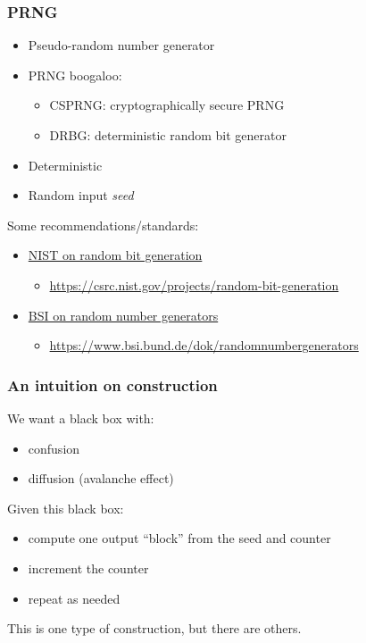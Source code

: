 \begin{frame}
  \frametitle{PRNG}

  \begin{itemize}[<+->]
    \item Pseudo-random number generator
    \item PRNG boogaloo:
    \begin{itemize}
      \item CSPRNG: cryptographically secure PRNG
      \item DRBG: deterministic random bit generator
    \end{itemize}
    \item Deterministic
    \item Random input \emph{seed}
  \end{itemize}

  \vspace*{1em}

  \pause
  Some recommendations/standards:
  \begin{itemize}
    \item \href{https://csrc.nist.gov/projects/random-bit-generation}{NIST on random bit generation}
    \begin{itemize}
      \item \url{https://csrc.nist.gov/projects/random-bit-generation}
    \end{itemize}
    \item \href{https://www.bsi.bund.de/dok/randomnumbergenerators}{BSI on random number generators}
    \begin{itemize}
      \item \url{https://www.bsi.bund.de/dok/randomnumbergenerators}
    \end{itemize}
  \end{itemize}
\end{frame}

\begin{frame}
  \frametitle{An intuition on construction}

  We want a black box with:
  \begin{itemize}[<+(1)->]
    \item confusion
    \item diffusion (avalanche effect)
  \end{itemize}

  \pause
  Given this black box:
  \begin{itemize}[<+(1)->]
    \item compute one output \enquote{block} from the seed and counter
    \item increment the counter
    \item repeat as needed
  \end{itemize}

  \pause
  This is one type of construction, but there are others.
\end{frame}

